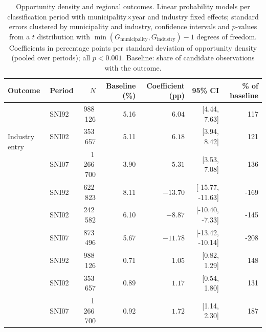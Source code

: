 \begin{table}[htbp]
\centering
\small
\caption{Opportunity density and regional outcomes. Linear probability models per classification period with municipality$\times$year and industry fixed effects; standard errors clustered by municipality and industry, confidence intervals and $p$-values from a $t$ distribution with $\min(G_{\text{municipality}}, G_{\text{industry}})-1$ degrees of freedom. Coefficients in percentage points per standard deviation of opportunity density (pooled over periods); all $p<0.001$. Baseline: share of candidate observations with the outcome.}
\label{tab:regional_results}
\begin{tabular}{llrrrrr}
\toprule
Outcome & Period & $N$ & Baseline (\%) & Coefficient (pp) & 95\% CI & \% of baseline \\
\midrule
\multirow{3}{*}{Industry entry} & SNI92 & 988\,126 & 5.16 & $6.04$ & [4.44, 7.63] & 117 \\
 & SNI02 & 353\,657 & 5.11 & $6.18$ & [3.94, 8.42] & 121 \\
 & SNI07 & 1\,266\,700 & 3.90 & $5.31$ & [3.53, 7.08] & 136 \\
\addlinespace
\multirow{3}{*}{Industry exit} & SNI92 & 622\,823 & 8.11 & $-13.70$ & [-15.77, -11.63] & -169 \\
 & SNI02 & 242\,582 & 6.10 & $-8.87$ & [-10.40, -7.33] & -145 \\
 & SNI07 & 873\,496 & 5.67 & $-11.78$ & [-13.42, -10.14] & -208 \\
\addlinespace
\multirow{3}{*}{Startup formation} & SNI92 & 988\,126 & 0.71 & $1.05$ & [0.82, 1.29] & 148 \\
 & SNI02 & 353\,657 & 0.89 & $1.17$ & [0.54, 1.80] & 131 \\
 & SNI07 & 1\,266\,700 & 0.92 & $1.72$ & [1.14, 2.30] & 187 \\
\bottomrule
\end{tabular}
\end{table}
